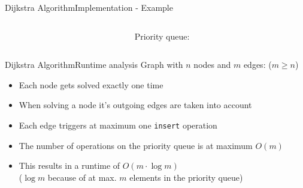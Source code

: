
\begin{frame}{Dijkstra Algorithm}{Implementation - Example}
  \begin{columns}[T]
    \begin{column}{0.6\linewidth}
      \begin{center}
        \begin{adjustbox}{width=0.9\linewidth}
          
        \end{adjustbox}
      \end{center}
    \end{column}
    \begin{column}{0.4\linewidth}
      Priority queue:
    \end{column}
  \end{columns}
\end{frame}


\begin{frame}{Dijkstra Algorithm}{Runtime analysis}
  Graph with {\color{MainA}$n$} nodes and {\color{MainA}$m$}
  edges: ({\color{MainA}$m \geq n$})
  \begin{itemize}
    \item
      Each node gets solved exactly {\color{MainA}one time}
    \item
      When solving a node it's outgoing edges are taken into account
    \item
      Each edge triggers at maximum one \texttt{insert} operation
    \item
      The number of operations on the {\color{MainA}priority queue}
      is at maximum {\color{MainA}$O(m)$}
    \item
      This results in a runtime of
      {\color{MainA}$O(m \cdot \log m)$}\\
      {\color{gray}($\log m$ because of at max. $m$ elements in the priority
        queue)}
  \end{itemize}
\end{frame}


